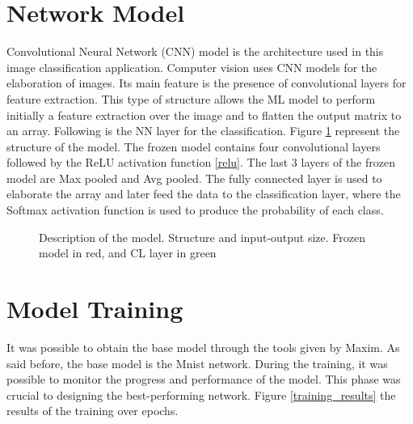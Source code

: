 \section{Network Model}
\label{sec:network_model}

\quad Convolutional Neural Network (CNN) model is the architecture used in this image classification application. Computer vision uses CNN models for the elaboration of images. Its main feature is the presence of convolutional layers for feature extraction. This type of structure allows the ML model to perform initially a feature extraction over the image and to flatten the output matrix to an array. Following is the NN layer for the classification. Figure \ref{input_output_model} represent the structure of the model. The frozen model contains four convolutional layers followed by the ReLU activation function \ref{relu}. The last 3 layers of the frozen model are Max pooled and Avg pooled. The fully connected layer is used to elaborate the array and later feed the data to the classification layer, where the Softmax activation function is used to produce the probability of each class. 

\begin{figure}[!ht]
\centerline{}
\caption{Description of the model. Structure and input-output size. Frozen model in red, and CL layer in green}
\label{input_output_model}
\end{figure}

\section{Model Training}
\label{sec:model_training}

\quad It was possible to obtain the base model through the tools given by Maxim. As said before, the base model is the Mnist network. During the training, it was possible to monitor the progress and performance of the model. This phase was crucial to designing the best-performing network. Figure \ref{training_results} the results of the training over epochs.

